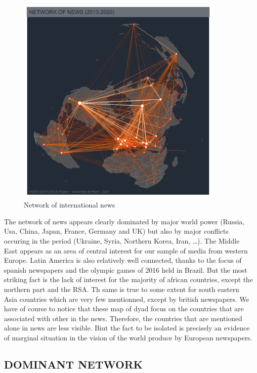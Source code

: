 \documentclass[
]{article}
\begin{document}
\begin{figure}
\centering
\includegraphics[width=0.9\textwidth,height=\textheight]{img/News_global.png}
\caption{Network of international news}
\end{figure}

The network of news appears clearly dominated by major world power
(Russia, Usa, China, Japan, France, Germany and UK) but also by major
conflicts occuring in the period (Ukraine, Syria, Northern Korea, Iran,
\ldots). The Middle East appears as an area of central interest for our
sample of media from western Europe. Latin America is also relatively
well connected, thanks to the focus of spanish newspapers and the
olympic games of 2016 held in Brazil. But the most striking fact is the
lack of interest for the majority of african countries, except the
northern part and the RSA. Th same is true to some extent for south
eastern Asia countries which are very few mentionned, except by british
newspapers. We have of course to notice that these map of dyad focus on
the countries that are associated with other in the news. Therefore, the
countries that are mentioned alone in news are less visible. Biut the
fact to be isolated is precisely an evidence of marginal situation in
the vision of the world produce by European newspapers.

\hypertarget{dominant-network}{%
\subsection{DOMINANT NETWORK}\label{dominant-network}}
\end{document}
